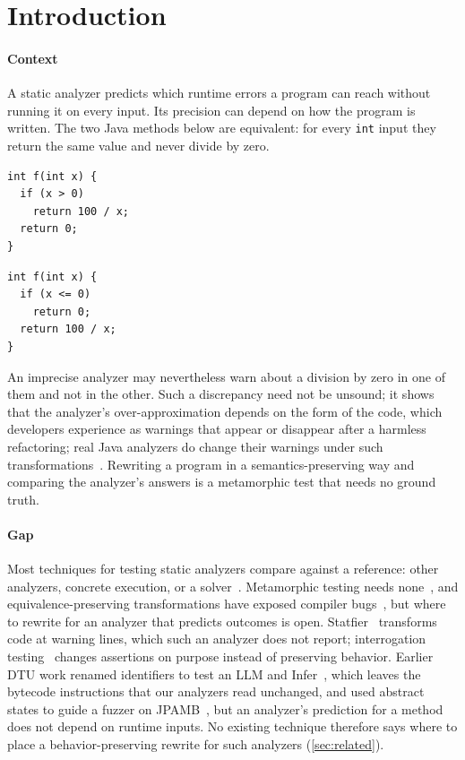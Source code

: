 \section{Introduction}
\label{sec:intro}

\paragraph{Context}
A static analyzer predicts which runtime errors a program can reach without
running it on every input. Its precision can depend on how the program is
written. The two Java methods below are equivalent: for every \texttt{int}
input they return the same value and never divide by zero.

\noindent
\begin{minipage}[t]{0.47\linewidth}
\begin{lstlisting}
int f(int x) {
  if (x > 0)
    return 100 / x;
  return 0;
}
\end{lstlisting}
\end{minipage}
\hfill
\begin{minipage}[t]{0.47\linewidth}
\begin{lstlisting}
int f(int x) {
  if (x <= 0)
    return 0;
  return 100 / x;
}
\end{lstlisting}
\end{minipage}

\noindent
An imprecise analyzer may nevertheless warn about a division by zero in one of
them and not in the other. Such a discrepancy need not be unsound; it shows that
the analyzer's over-approximation depends on the form of the code, which
developers experience as warnings that appear or disappear after a harmless
refactoring; real Java analyzers do change their warnings under such
transformations~\citep{zhang2023statfier}. Rewriting a program in a semantics-preserving way and comparing
the analyzer's answers is a metamorphic test that needs no ground truth.

\paragraph{Gap}
Most techniques for testing static analyzers compare against a reference:
other analyzers, concrete execution, or a
solver~\citep{klinger2019,cuoq2012,taneja2020}. Metamorphic testing needs
none~\citep{chen2018}, and equivalence-preserving transformations have exposed
compiler bugs~\citep{le2014emi,donaldson2017}, but where to rewrite for an
analyzer that predicts outcomes is open. Statfier~\citep{zhang2023statfier}
transforms code at warning lines, which such an analyzer does not report;
interrogation testing~\citep{kaindlstorfer2024} changes assertions on purpose
instead of preserving behavior. Earlier DTU work renamed identifiers to test an
LLM and Infer~\citep{chand2024}, which leaves the bytecode instructions that
our analyzers read unchanged, and used abstract states to guide a fuzzer on
JPAMB~\citep{domingues2025}, but an analyzer's prediction for a method does not
depend on runtime inputs. No existing technique therefore says where to place
a behavior-preserving rewrite for such analyzers (\cref{sec:related}).


